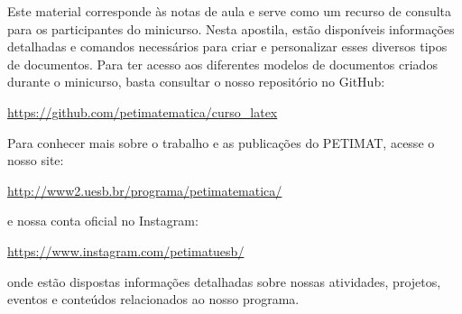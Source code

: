 \noindent Este material corresponde \`as notas de aula e serve como um recurso de consulta para os participantes do minicurso. Nesta apostila, est\~ao dispon\'iveis informações detalhadas e comandos necess\'arios para criar e personalizar esses diversos tipos de documentos. Para ter acesso aos diferentes modelos de documentos criados durante o minicurso, basta consultar o nosso reposit\'orio no GitHub:
\begin{center}
    \url{https://github.com/petimatematica/curso_latex}
\end{center}
\noindent Para conhecer mais sobre o trabalho e as publica\c c\~oes do PETIMAT, acesse o nosso site: 
\begin{center}
\url{http://www2.uesb.br/programa/petimatematica/}
\end{center}
e nossa conta oficial no Instagram: 
\begin{center}
\url{https://www.instagram.com/petimatuesb/}
\end{center}
onde est\~ao dispostas informa\c c\~oes detalhadas sobre nossas atividades, projetos, eventos e conte\'udos relacionados ao nosso programa.



